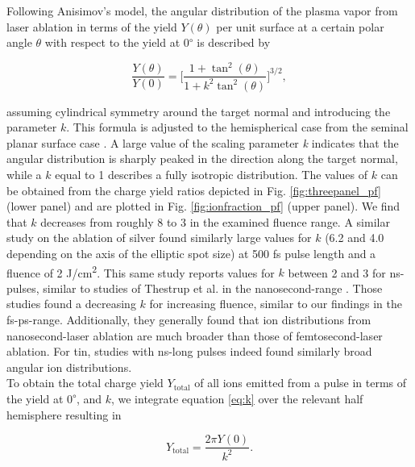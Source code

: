 \documentclass[aip, jap, reprint, amsmath, amssymb]{revtex4-1}
\begin{document}
Following Anisimov's model\cite{anisimov1993,doggett2011}, the angular distribution of the plasma vapor from laser ablation in terms of the yield $Y(\theta)$ per unit surface at a certain polar angle $\theta$ with respect to the yield at 0\textsuperscript{$\circ$} is described by

\begin{equation}
\label{eq:k}
\frac{Y(\theta)}{Y(0)}=\bigg[\frac{1+\tan^2(\theta)}{1+k^2\tan^2(\theta)}\bigg]^{3/2},
\end{equation}


assuming cylindrical symmetry around the target normal and introducing the parameter $k$. This formula is adjusted to the hemispherical case\cite{doggett2011} from the seminal planar surface case \cite{anisimov1993}. A large value of the scaling parameter \textit{k} indicates that the angular distribution is sharply peaked in the direction along the target normal, while a $k$ equal to 1 describes a fully isotropic distribution. The values of $k$ can be obtained from the charge yield ratios depicted in Fig. \ref{fig:threepanel_pf} (lower panel) and are plotted in Fig. \ref{fig:ionfraction_pf} (upper panel). We find that $k$ decreases from roughly 8 to 3 in the examined fluence range. A similar study on the ablation of silver \cite{toftmann2013} found similarly large values for $k$ (6.2 and 4.0 depending on the axis of the elliptic spot size) at 500 fs pulse length and a fluence of 2 J/cm\textsuperscript{2}. This same study reports values for $k$ between 2 and 3 for ns-pulses, similar to studies of Thestrup et al. in the nanosecond-range \cite{thestrup2002, thestrup2003}. Those studies found a decreasing $k$ for increasing fluence, similar to our findings in the fs-ps-range. Additionally, they generally found that ion distributions from nanosecond-laser ablation are much broader than those of femtosecond-laser ablation. For tin, studies with ns-long pulses indeed found similarly broad angular ion distributions\cite{campos2010, freeman2012}.\\

To obtain the total charge yield $Y_{\textrm{total}}$ of all ions emitted from a pulse in terms of the yield at 0\textsuperscript{$\circ$}, and $k$, we integrate equation \ref{eq:k} over the relevant half hemisphere resulting in

\begin{equation}
\label{eq:totalyield}
Y_{\textrm{total}}=\frac{2\pi Y(0)}{k^{2}}.
\end{equation}
\end{document}
